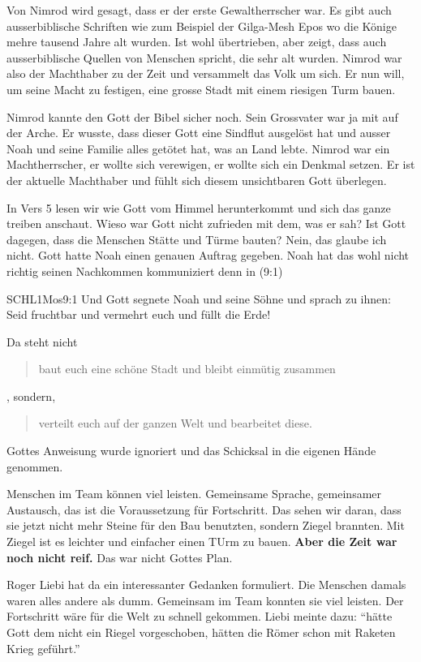 \documentclass[12pt]{../../inc/mybib}
\newcommand{\q}[1]{\blockquote{#1}}
\newenvironment{block}[1][]{%
  \vspace{1.5em}%
  \noindent\textbf{#1}\par%
  \vspace{0.0em}%
}{%
  \vspace{1em}%
}
\begin{document}
\begin{block}
    Von Nimrod wird gesagt, dass er der erste Gewaltherrscher war. Es gibt auch ausserbiblische Schriften wie zum Beispiel der Gilga-Mesh Epos wo die Könige mehre tausend Jahre alt wurden. Ist wohl übertrieben, aber zeigt, dass auch ausserbiblische Quellen von Menschen spricht, die sehr alt wurden. Nimrod war also der Machthaber zu der Zeit und versammelt das Volk um sich. Er nun will, um seine Macht zu festigen, eine grosse Stadt mit einem riesigen Turm bauen.
\end{block}
\begin{block}
    Nimrod kannte den Gott der Bibel sicher noch. Sein Grossvater war ja mit auf der Arche. Er wusste, dass dieser Gott eine Sindflut ausgelöst hat und ausser Noah und seine Familie alles getötet hat, was an Land lebte. Nimrod war ein Machtherrscher, er wollte sich verewigen, er wollte sich ein Denkmal setzen. Er ist der aktuelle Machthaber und fühlt sich diesem unsichtbaren Gott überlegen.
\end{block}
\begin{block}
    In Vers 5 lesen wir wie Gott vom Himmel herunterkommt und sich das ganze treiben anschaut. Wieso war Gott nicht zufrieden mit dem, was er sah? Ist Gott dagegen, dass die Menschen Stätte und Türme bauten? Nein, das glaube ich nicht. Gott hatte Noah einen genauen Auftrag gegeben. Noah hat das wohl nicht richtig seinen Nachkommen kommuniziert denn in (9:1)
    \begin{bibelbox}{SCHL}{1Mos}{9:1}
        Und Gott segnete Noah und seine Söhne und sprach zu ihnen: Seid fruchtbar und vermehrt euch und füllt die Erde!
    \end{bibelbox}    
    
    Da steht nicht \q{baut euch eine schöne Stadt und  bleibt einmütig zusammen}, sondern, \q{verteilt euch auf der ganzen Welt und bearbeitet diese.} Gottes Anweisung wurde ignoriert und das Schicksal in die eigenen Hände genommen. 
\end{block}
\begin{block}
    Menschen im Team können viel leisten. Gemeinsame Sprache, gemeinsamer Austausch, das ist die Voraussetzung für Fortschritt. Das sehen wir daran, dass sie jetzt nicht mehr Steine für den Bau benutzten, sondern Ziegel brannten. Mit Ziegel ist es leichter und einfacher einen TUrm zu bauen. \textbf{Aber die Zeit war noch nicht reif.} Das war nicht Gottes Plan.
\end{block}
\begin{block}
    Roger Liebi hat da ein interessanter Gedanken formuliert. Die Menschen damals waren alles andere als dumm. Gemeinsam im Team konnten sie viel leisten. Der Fortschritt wäre für die Welt zu schnell gekommen. Liebi meinte dazu: \enquote{hätte Gott dem nicht ein Riegel vorgeschoben, hätten die Römer schon mit Raketen Krieg geführt.}
\end{block}
\end{document}
